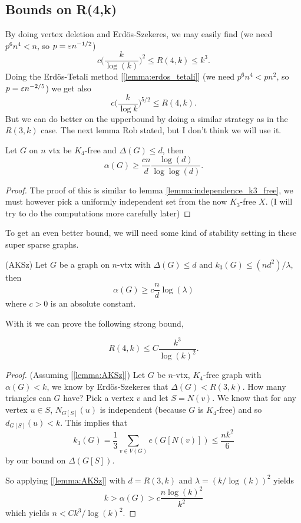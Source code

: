 \subsection{Bounds on R(4,k)}

By doing vertex deletion and Erdös-Szekeres, we may easily find (we
need $p^6n^4 < n$, so $p = \varepsilon n^{-1/2}$)
\[
	c\bigg(\frac{k}{\log(k)}\bigg)^2\leq R(4,k) \leq k^3.
\]
Doing the Erdös-Tetali method [\ref{lemma:erdos_tetali}] (we need
$p^6n^4 < pn^2$, so $p = \varepsilon n^{-2/5}$)
we get also
\[
	c\bigg(\frac{k}{\log k}\bigg)^{5/2} \leq R(4,k).
\]
But we can do better on the upperbound by doing a similar strategy as
in the $R(3,k)$ case. The next lemma Rob stated,
but I don't think we will use it.

\begin{lemma}
	Let $G$ on $n$ vtx be $K_4$-free and $\Delta(G) \leq d$, then
	\[
		\alpha(G) \geq \frac{cn}{d}\frac{\log (d)}{\log\log(d)}.
	\]
\end{lemma}

\begin{proof}
	The proof of this is similar to lemma
	\ref{lemma:independence_k3_free}, we must however pick a uniformly independent
	set from the now $K_3$-free $X$. (I will try to do the computations
	more carefully later)
\end{proof}

To get an even better bound, we will need some kind of stability
setting in these super sparse graphs.
\begin{lemma}
	\label{lemma:AKSz}
	(AKSz) Let $G$ be a graph on $n$-vtx with $\Delta(G) \leq d$ and
	$k_3(G) \leq (nd^2)/\lambda$,
	then
	\[
		\alpha(G) \geq c\frac{n}{d}\log(\lambda)
	\]
	where $c > 0$ is an absolute constant.
\end{lemma}

With it we can prove the following strong bound,

\begin{theorem}
	\label{trm:aksz_r4k}
	\[
		R(4,k) \leq C\frac{k^3}{\log(k)^2}.
	\]
\end{theorem}
\begin{proof}
	(Assuming [\ref{lemma:AKSz}]) Let $G$ be $n$-vtx, $K_4$-free graph
	with $\alpha(G) < k$,
	we know by Erdös-Szekeres that $\Delta(G) < R(3,k)$. How many
	triangles can $G$ have?
	Pick a vertex $v$ and let $S = N(v)$. We know that for any vertex
	$u \in S$, $N_{G[S]}(u)$ is independent
	(because $G$ is $K_4$-free) and so $d_{G[S]}(u) < k$. This implies that
	\[
		k_3(G) = \frac{1}{3} \sum_{v \in V(G)} e(G[N(v)]) \leq \frac{nk^2}{6}
	\]
	by our bound on $\Delta(G[S])$.

	So applying [\ref{lemma:AKSz}] with $d = R(3,k)$ and $\lambda =
	(k/\log(k))^2$ yields
	\[
		k > \alpha(G) > c\frac{n\log(k)^2}{k^2}
	\]
	which yields $n < Ck^3/\log(k)^2$.
\end{proof}

